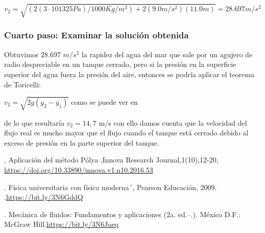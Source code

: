 \documentclass[12pt,letterpaper]{article}
\begin{document}
\begin{equation*}
    v_2=\sqrt{(2(3\cdot 101325 Pa)/1000 Kg/m^3) + 2(9.0 m/s^2)(11.0 m)}= 28.697 m/s^2
\end{equation*}

\subsubsection{Cuarto paso: Examinar la solución obtenida}

Obtuvimos $28.697$ $m/s^2$ la rapidez del agua del mar que sale por un agujero de radio despreciable en un tanque cerrado, pero si la presión en la superficie superior del agua fuera la presión del aire, entonces se podría aplicar el teorema de Toricelli:

\begin{center}
$ v_2 = \sqrt{2g(y_2 - y_1)} $ como se puede ver en \cite[pág 378]{Baz}
\end{center}

de lo que resultaría $v_2 =14,7$ m/s con ello damos cuenta que la velocidad del flujo real es mucho mayor que el flujo cuando el tanque está cerrado debido al exceso de presión en la parte superior del tanque.

\begin{thebibliography}{X}

, Aplicación del método Pólya ,Innova Research Journal,1(10),12-20, \url{https://doi.org/10.33890/innova.v1.n10.2016.53}

. Física universitaria con física moderna´, Pearson Educación, 2009. .\url{https://bit.ly/3N6GddQ}

. Mecánica de fluidos: Fundamentos y aplicaciones (2a. ed.--.). México D.F.: McGraw Hill.\url{https://bit.ly/3N6Jaeq}

\end{thebibliography}
\end{document}
